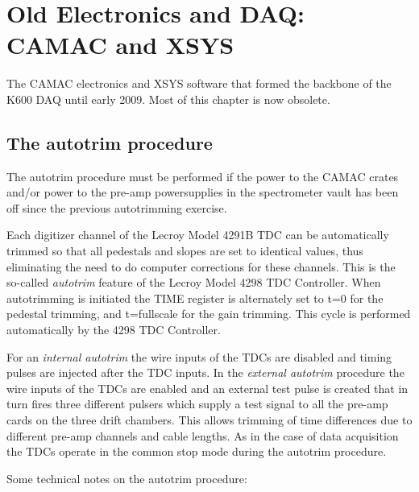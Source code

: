 \documentclass[11pt]{report}
\begin{document}
\chapter{Old Electronics and DAQ: CAMAC and XSYS}\label{chap:daq-and-electronics-old}
    

The CAMAC electronics and XSYS software 
that formed the backbone of the K600 DAQ until early 2009.
Most of this chapter is now obsolete.


\section{The autotrim procedure}

The autotrim procedure must be performed if the power to the CAMAC
crates and/or power to the pre-amp powersupplies in the spectrometer 
vault has been off since the previous autotrimming exercise.

Each digitizer channel of the Lecroy Model 4291B TDC can be 
automatically trimmed so that all pedestals and slopes are set to identical
values, thus eliminating the need to do computer corrections for these 
channels.  This is the so-called {\it autotrim} feature of the 
Lecroy Model 4298 TDC Controller.
When autotrimming is initiated the TIME register is alternately set to t=0 
for the pedestal trimming, and t=fullscale for the gain trimming. This
cycle is performed automatically by the 4298 TDC Controller.

For an {\it internal autotrim} the wire inputs of the TDCs are disabled 
and timing pulses are injected after the TDC inputs. 
In the {\it external autotrim} procedure the wire inputs of the TDCs
are enabled and an external test pulse is created that in turn fires
three different pulsers which supply a test signal to all the pre-amp cards
on the three drift chambers.
This allows trimming of time differences due to different 
pre-amp channels and cable lengths.
As in the case of data acquisition the TDCs operate in the common stop mode
during the autotrim procedure.

Some technical notes on the autotrim procedure:
\end{document}

